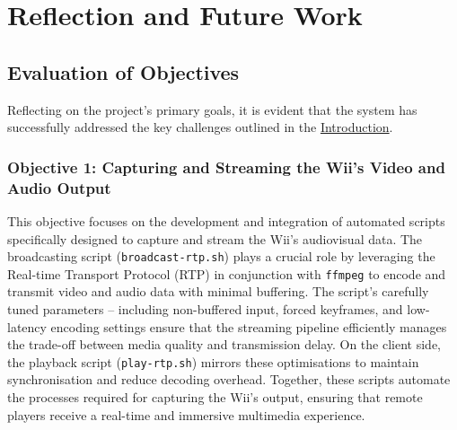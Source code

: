 \section{Reflection and Future Work}



%
\subsection{Evaluation of Objectives}
Reflecting on the project’s primary goals, it is evident that the system has successfully addressed the key challenges outlined in the \hyperlink{chapter:introduction}{Introduction}.

\subsubsection{Objective 1: Capturing and Streaming the Wii's Video and Audio Output}
This objective focuses on the development and integration of automated scripts
specifically designed to capture and stream the Wii's audiovisual data. The
broadcasting script (\texttt{broadcast-rtp.sh}) plays a crucial role by
leveraging the Real-time Transport Protocol (RTP) in conjunction with
\texttt{ffmpeg} to encode and transmit video and audio data with minimal
buffering. The script's carefully tuned parameters -- including non-buffered input,
forced keyframes, and low-latency encoding settings ensure that the streaming
pipeline efficiently manages the trade-off between media quality and
transmission delay. On the client side, the playback script
(\texttt{play-rtp.sh}) mirrors these optimisations to maintain synchronisation
and reduce decoding overhead. Together, these scripts automate the processes
required for capturing the Wii’s output, ensuring that remote players receive a
real-time and immersive multimedia experience.

